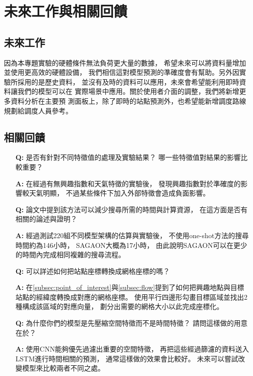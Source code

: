 \documentclass[a4paper,14pt]{extarticle}
\begin{document}
    \newpage
    \section{未來工作與相關回饋}
        \subsection{未來工作}
            因為本專題實驗的硬體條件無法負荷更大量的數據，
            希望未來可以將資料量增加並使用更高效的硬體設備，
            我們相信這對模型預測的準確度會有幫助。另外因實驗所採用的是歷史資料，
            並沒有及時的資料可以應用，未來會希望能利用即時資料讓我們的模型可以在
            實際場景中應用。關於使用者介面的調整，我們將新增更多資料分析在主要預
            測面板上，除了即時的站點預測外，也希望能新增調度路線規劃給調度人員參考。
        \subsection{相關回饋}
            \begin{itemize}
                \item [\textbf{Q:}]
                是否有針對不同特徵值的處理及實驗結果？
                哪一些特徵值對結果的影響比較重要？
                \item [\textbf{A:}]
                在經過有無興趣指數和天氣特徵的實驗後，
                發現興趣指數對於準確度的影響較天氣明顯，
                不過某些條件下加入外部特徵會造成負面影響。
                \item [\textbf{Q:}]
                論文中提到該方法可以減少搜尋所需的時間與計算資源，
                在這方面是否有相關的論述與證明？
                \item [\textbf{A:}]
                經過測試220組不同模型架構的估算與實驗後，
                不使用one-shot方法的搜尋時間約為146小時，
                SAGAON大概為17小時，
                由此說明SAGAON可以在更少的時間內完成相同複雜的搜尋流程。
                \item [\textbf{Q:}]
                可以詳述如何把站點座標轉換成網格座標的嗎？
                \item [\textbf{A:}]
                在\ref{subsec:point_of_interest}與\ref{subsec:flow}提到了如何把興趣地點與目標站點的經緯度轉換成對應的網格座標。
                使用平行四邊形勾畫目標區域並找出2種構成該區域的對應向量，
                劃分出需要的網格大小以此完成座標化。
                \item [\textbf{Q:}]
                為什麼你們的模型是先壓縮空間特徵而不是時間特徵？
                請問這樣做的用意在於？
                \item [\textbf{A:}]
                使用CNN能夠優先過濾出重要的空間特徵，
                再把這些經過篩濾的資料送入LSTM進行時間相關的預測，
                通常這樣做的效果會比較好。
                未來可以嘗試改變模型來比較兩者不同之處。
            \end{itemize}
\end{document}
